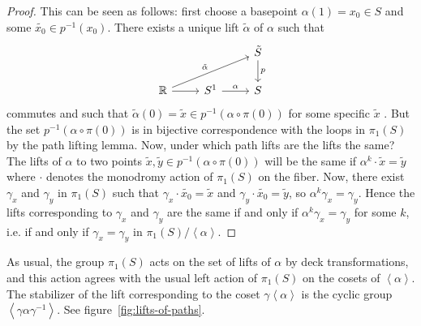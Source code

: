\documentclass[reqno]{amsart}
\theoremstyle{definition}
\theoremstyle{remark}
\begin{document}
\begin{proof}
    
 This can be seen as follows: first choose
 a basepoint $\alpha(1) =  x_0 \in S$
and
 some $\tilde{x_0} \in p^{-1}(x_0)$. There exists a unique lift
 $\tilde{\alpha}$ of $\alpha$ such that
 \begin{equation*}
 \begin{tikzcd}
     & & \tilde{S}\ar[d, "p"] \\
     \mathbb{R} \ar[r] \ar[rru, "\tilde{\alpha}"] & S^{1} \ar[r, "\alpha"] & S
 \end{tikzcd}
 \end{equation*}
 commutes and such that
 $\tilde{\alpha}(0) = \tilde{x} \in p^{-1}(\alpha \circ \pi (0))$
 for some specific $\tilde{x}$  \cite[Cor. 4.2]{Bredon}.
 But the set
 $p^{-1} \left( \alpha \circ \pi (0) \right) $ is in bijective
 correspondence with the loops in $\pi_1 (S)$ by the path lifting lemma. 
 Now, under which path lifts are the lifts the same? The lifts of
 $\alpha$ to two points $\tilde{x}, \tilde{y} \in 
 p^{-1}\left( \alpha \circ \pi (0) \right) $ will be the same if
 $\alpha^{k} \cdot \tilde{x} = \tilde{y}$ where
 $\cdot $ denotes the monodromy action of $\pi_1 (S)$ on
 the fiber. Now, there exist $\gamma_x$ and
 $\gamma_y$ in $\pi_1 (S)$ such that
 $\gamma_x \cdot \tilde{x_0} = \tilde{x}$ and
 $\gamma_y \cdot \tilde{x_0} = \tilde{y}$, so
 $\alpha^k \gamma_x = \gamma_y$. Hence the lifts
 corresponding to $\gamma_x$ and $\gamma_y$ are the same if and only
 if $\alpha^k \gamma_x = \gamma_y$ for some $k$, i.e. if and only if
 $\gamma_x = \gamma_y$ in $\pi_1(S) / \left<\alpha \right>$.

\end{proof}

 As usual, the group $\pi_1 (S)$ acts on the set of lifts
 of $\alpha$ by deck transformations, and this action agrees
 with the usual left action of $\pi_1 (S)$ on the
 cosets of $\left<\alpha \right>$. The stabilizer of the lift
 corresponding to the coset $\gamma \left<\alpha \right>$ is
 the cyclic group $\left<\gamma \alpha \gamma^{-1} \right>$. See
 figure~\ref{fig:lifts-of-paths}.
\end{document}
